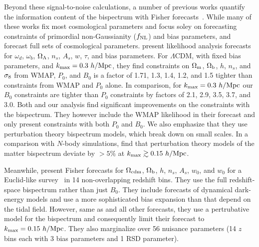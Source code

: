 Beyond these signal-to-noise calculations, a number of previous works quantify 
the information content of the bispectrum with Fisher 
forecasts~\citep{scoccimarro2004, sefusatti2006, sefusatti2007, song2015, tellarini2016, yamauchi2017a, karagiannis2018, yankelevich2019}. While many of these works fix most cosmological parameters
and focus soley on forecasting constraints of primordial non-Gaussianity 
($f_{\rm NL}$) and bias parameters, \cite{sefusatti2006} and \cite{yankelevich2019} 
forecast full sets of cosmological parameters. \cite{sefusatti2006} present 
likelihood analysis forecasts for $\omega_d$, $\omega_b$, $\Omega_\Lambda$, $n_s$, 
$A_s$, $w$, $\tau$, and bias parameters. %
For $\Lambda$CDM, with fixed bias parameters, and $k_{\rm max} = 0.3~h/{\rm Mpc}$, 
they find constraints on $\Omega_{\rm m}$, $\Omega_{\rm b}$, $h$, $n_s$, and $\sigma_8$ from WMAP, 
$P_0$, and $B_0$ is a factor of 1.71, 1.3, 1.4, 1.2, and 1.5 tighter 
than constraints from WMAP and $P_0$ alone. In comparison, for 
$k_{\rm max} = 0.3~h/{\rm Mpc}$ our $B_0$ constraints are tighter than $P_0$ constraints 
by factors of 2.1, 2.9, 3.5, 3.7, and 3.0. Both \cite{sefusatti2006} and our 
analysis find significant improvements on the constraints with the 
bispectrum. They however include the WMAP likelihood in their forecast 
and only present constraints with both $P_0$ and $B_0$. We also emphasize 
that they use perturbation theory bispectrum models, which break down on 
small scales. In a comparison with $N$-body simulations, \cite{lazanu2016} 
find that perturbation theory models of the matter bispectrum deviate by 
$>5\%$ at $k_{\rm max} \gtrsim 0.15~h/{\rm Mpc}$. 

Meanwhile, \cite{yankelevich2019} present Fisher forecasts for 
$\Omega_{\rm cdm}$, $\Omega_{\rm b}$, $h$, $n_s$, $A_s$, $w_0$, and $w_0$ for a Euclid-like
survey~\citep{laureijs2011} in 14 non-overlapping redshift bins. They use the full redshift-space 
bispectrum rather than just $B_0$. They include forecasts of dynamical 
dark-energy models and use a more sophisticated bias expansion than 
\cite{sefusatti2006} that depend on the tidal field. However, same as 
\cite{sefusatti2006} and all other forecasts, they use a pertrubative 
model for the bispectrum and consequently limit their forecast to 
$k_{\rm max} = 0.15~h/{\rm Mpc}$. They also marginalize over 56 nuisance 
parameters (14 $z$ bins each with 3 bias parameters and 1 RSD parameter).

